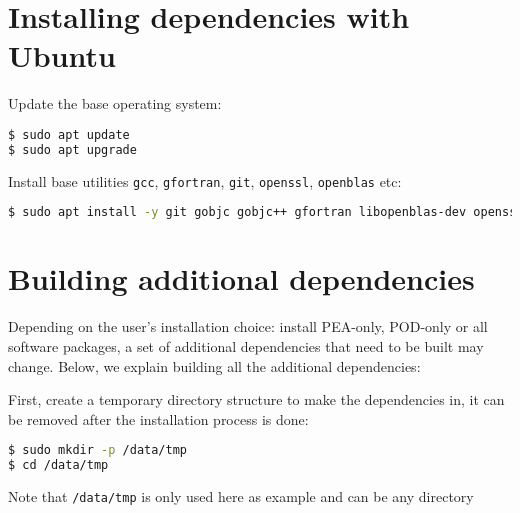 \section{Installing dependencies with Ubuntu}\label{installing-dependencies-with-ubuntu}


Update the base operating system:

\begin{lstlisting}[language=bash]
$ sudo apt update
$ sudo apt upgrade
\end{lstlisting}

Install base utilities \texttt{gcc}, \texttt{gfortran}, \texttt{git},
\texttt{openssl}, \texttt{openblas} etc:

\begin{lstlisting}[language=bash]
$ sudo apt install -y git gobjc gobjc++ gfortran libopenblas-dev openssl curl net-tools openssh-server cmake make libssl1.0-dev
\end{lstlisting}


\section{Building additional
dependencies}\label{building-additional-dependencies}

Depending on the user's installation choice: install PEA-only, POD-only
or all software packages, a set of additional dependencies that need to
be built may change. Below, we explain building all the additional
dependencies:

First, create a temporary directory structure to make the dependencies
in, it can be removed after the installation process is done:

\begin{lstlisting}[language=bash]
$ sudo mkdir -p /data/tmp
$ cd /data/tmp
\end{lstlisting}

Note that \texttt{/data/tmp} is only used here as example and can be any
directory

